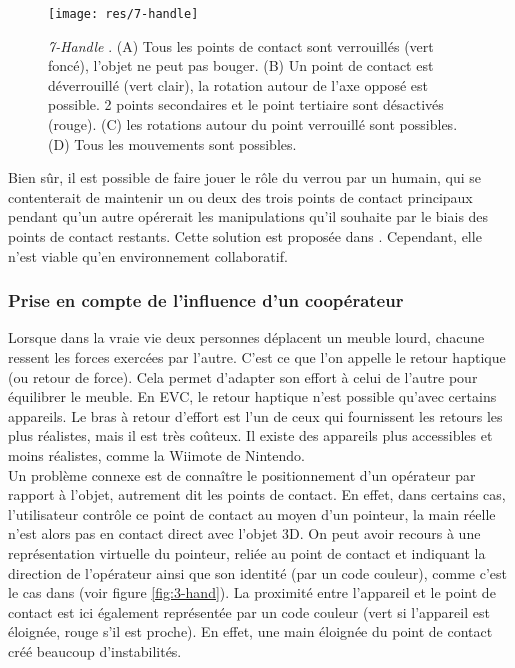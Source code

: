 \documentclass[11pt]{article}
\begin{document}
\begin{figure}[!h]
\centering
\texttt{[image: res/7-handle]}
\caption{\label{fig:7-handler}\textit{7-Handle} \cite{thesis}. (A) Tous les points de contact sont verrouillés (vert foncé), l'objet ne peut pas bouger. (B) Un point de contact est déverrouillé (vert clair), la rotation autour de l'axe opposé est possible. 2 points secondaires et le point tertiaire sont désactivés (rouge). (C) les rotations autour du point verrouillé sont possibles. (D) Tous les mouvements sont possibles.}
\end{figure}

Bien sûr, il est possible de faire jouer le rôle du verrou par un humain, qui se contenterait de maintenir un ou deux des trois points de contact principaux pendant qu'un autre opérerait les manipulations qu'il souhaite par le biais des points de contact restants. Cette solution est proposée dans \cite{3-hand}. Cependant, elle n'est viable qu'en environnement collaboratif.

\subsubsection{Prise en compte de l'influence d'un coopérateur}
Lorsque dans la vraie vie deux personnes déplacent un meuble lourd, chacune ressent les forces exercées par l'autre. C'est ce que l'on appelle le retour haptique (ou retour de force). Cela permet d'adapter son effort à celui de l'autre pour équilibrer le meuble. En EVC, le retour haptique n'est possible qu'avec certains appareils. Le bras à retour d'effort est l'un de ceux qui fournissent les retours les plus réalistes, mais il est très coûteux. Il existe des appareils plus accessibles et moins réalistes, comme la Wiimote de Nintendo. 
\\

Un problème connexe est de connaître le positionnement d'un opérateur par rapport à l'objet, autrement dit les points de contact. En effet, dans certains cas, l'utilisateur contr\^ole ce point de contact au moyen d'un pointeur, la main réelle n'est alors pas en contact direct avec l'objet 3D. On peut avoir recours à une représentation virtuelle du pointeur, reliée au point de contact et indiquant la direction de l'opérateur ainsi que son identité (par un code couleur), comme c'est le cas dans \cite{3-hand} (voir figure \ref{fig:3-hand}). La proximité entre l'appareil et le point de contact est ici également représentée par un code couleur (vert si l'appareil est éloignée, rouge s'il est proche). En effet, une main éloignée du point de contact créé beaucoup d'instabilités. 
\end{document}
